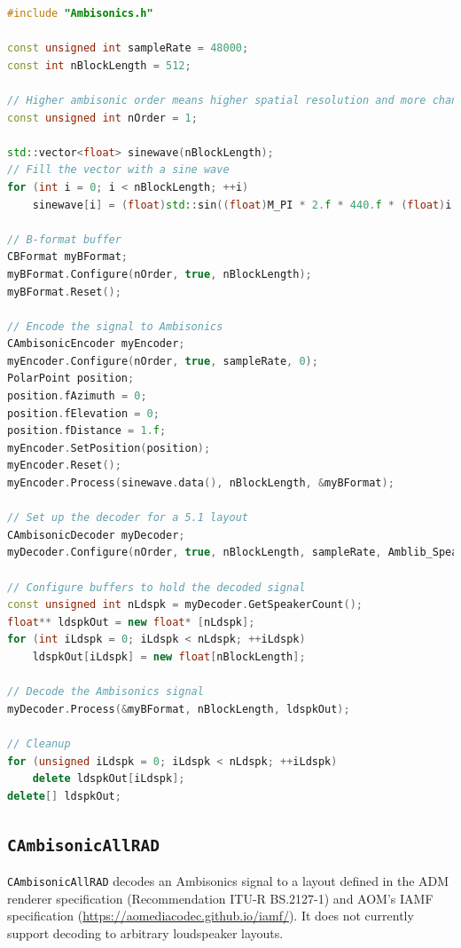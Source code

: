 \documentclass[12pt]{report}
\newcommand{\code}[1]{\texttt{#1}}
\begin{document}
\begin{lstlisting}[language=C++]
#include "Ambisonics.h"

const unsigned int sampleRate = 48000;
const int nBlockLength = 512;

// Higher ambisonic order means higher spatial resolution and more channels required
const unsigned int nOrder = 1;

std::vector<float> sinewave(nBlockLength);
// Fill the vector with a sine wave
for (int i = 0; i < nBlockLength; ++i)
    sinewave[i] = (float)std::sin((float)M_PI * 2.f * 440.f * (float)i / (float)sampleRate);

// B-format buffer
CBFormat myBFormat;
myBFormat.Configure(nOrder, true, nBlockLength);
myBFormat.Reset();

// Encode the signal to Ambisonics
CAmbisonicEncoder myEncoder;
myEncoder.Configure(nOrder, true, sampleRate, 0);
PolarPoint position;
position.fAzimuth = 0;
position.fElevation = 0;
position.fDistance = 1.f;
myEncoder.SetPosition(position);
myEncoder.Reset();
myEncoder.Process(sinewave.data(), nBlockLength, &myBFormat);

// Set up the decoder for a 5.1 layout
CAmbisonicDecoder myDecoder;
myDecoder.Configure(nOrder, true, nBlockLength, sampleRate, Amblib_SpeakerSetUps::kAmblib_51);

// Configure buffers to hold the decoded signal
const unsigned int nLdspk = myDecoder.GetSpeakerCount();
float** ldspkOut = new float* [nLdspk];
for (int iLdspk = 0; iLdspk < nLdspk; ++iLdspk)
    ldspkOut[iLdspk] = new float[nBlockLength];

// Decode the Ambisonics signal
myDecoder.Process(&myBFormat, nBlockLength, ldspkOut);

// Cleanup
for (unsigned iLdspk = 0; iLdspk < nLdspk; ++iLdspk)
    delete ldspkOut[iLdspk];
delete[] ldspkOut;
\end{lstlisting}

\subsection{\code{CAmbisonicAllRAD}}\label{CAmbisonicAllRAD}

\code{CAmbisonicAllRAD} decodes an Ambisonics signal to a layout defined in the ADM renderer specification (Recommendation ITU-R BS.2127-1) and AOM's IAMF specification (\href{https://aomediacodec.github.io/iamf/}{https://aomediacodec.github.io/iamf/}). It does not currently support decoding to arbitrary loudspeaker layouts.
\end{document}
